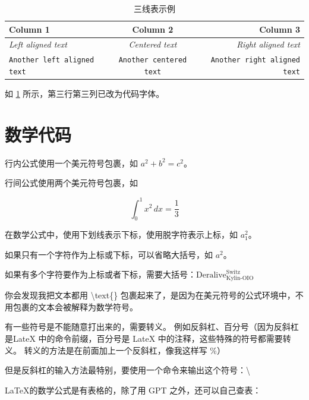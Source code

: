 \documentclass{article}
\begin{document}
\begin{table}[H]
    \centering
    \begin{tabular}{l c r}
        \toprule
        \textbf{Column 1}                  & \textbf{Column 2}              & \textbf{Column 3}                   \\
        \midrule
        \textit{Left aligned text}         & \textit{Centered text}         & \textit{Right aligned text}         \\
        \texttt{Another left aligned text} & \texttt{Another centered text} & \texttt{Another right aligned text} \\
        \bottomrule
    \end{tabular}
    \caption{三线表示例}
    \label{tab:my_table}
\end{table}

如 \ref{tab:my_table} 所示，第三行第三列已改为代码字体。

\section{数学代码}

行内公式使用一个美元符号包裹，如 $a^2 + b^2 = c^2$。

行间公式使用两个美元符号包裹，如

$$
    \int_{0}^{1} x^2 \, dx = \frac{1}{3}
$$

在数学公式中，使用下划线表示下标，使用脱字符表示上标，如 $a_{1}^{2}$。

如果只有一个字符作为上标或下标，可以省略大括号，如 $a^2$。

如果有多个字符要作为上标或者下标，需要大括号：$ \text{Deralive}_{\text{Kylin-OIO}}^{\text{Switz}} $

你会发现我把文本都用 \textbackslash text\{\} 包裹起来了，是因为在美元符号的公式环境中，不用包裹的文本会被解释为数学符号。

有一些符号是不能随意打出来的，需要转义。
例如反斜杠、百分号（因为反斜杠是LateX 中的命令前缀，百分号是 LateX 中的注释，这些特殊的符号都需要转义。
转义的方法是在前面加上一个反斜杠，像我这样写 \%）

但是反斜杠的输入方法最特别，要使用一个命令来输出这个符号：\textbackslash

\LaTeX 的数学公式是有表格的，除了用 GPT 之外，还可以自己查表：
\end{document}
